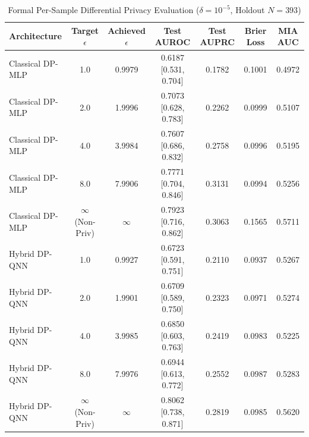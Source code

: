 \begin{table}[t]
\centering
\caption{Formal Per-Sample Differential Privacy Evaluation ($\delta = 10^{-5}$, Holdout $N=393$)}
\label{tab:differential_privacy}
\begin{tabular}{lcccccc}
\hline
\textbf{Architecture} & \textbf{Target $\epsilon$} & \textbf{Achieved $\epsilon$} & \textbf{Test AUROC} & \textbf{Test AUPRC} & \textbf{Brier Loss} & \textbf{MIA AUC} \\
\hline
Classical DP-MLP & 1.0 & 0.9979 & 0.6187 [0.531, 0.704] & 0.1782 & 0.1001 & 0.4972 \\
Classical DP-MLP & 2.0 & 1.9996 & 0.7073 [0.628, 0.783] & 0.2262 & 0.0999 & 0.5107 \\
Classical DP-MLP & 4.0 & 3.9984 & 0.7607 [0.686, 0.832] & 0.2758 & 0.0996 & 0.5195 \\
Classical DP-MLP & 8.0 & 7.9906 & 0.7771 [0.704, 0.846] & 0.3131 & 0.0994 & 0.5256 \\
Classical DP-MLP & $\infty$ (Non-Priv) & $\infty$ & 0.7923 [0.716, 0.862] & 0.3063 & 0.1565 & 0.5711 \\
\hline
Hybrid DP-QNN & 1.0 & 0.9927 & 0.6723 [0.591, 0.751] & 0.2110 & 0.0937 & 0.5267 \\
Hybrid DP-QNN & 2.0 & 1.9901 & 0.6709 [0.589, 0.750] & 0.2323 & 0.0971 & 0.5274 \\
Hybrid DP-QNN & 4.0 & 3.9985 & 0.6850 [0.603, 0.763] & 0.2419 & 0.0983 & 0.5225 \\
Hybrid DP-QNN & 8.0 & 7.9976 & 0.6944 [0.613, 0.772] & 0.2552 & 0.0987 & 0.5283 \\
Hybrid DP-QNN & $\infty$ (Non-Priv) & $\infty$ & 0.8062 [0.738, 0.871] & 0.2819 & 0.0985 & 0.5620 \\
\hline
\end{tabular}
\end{table}
